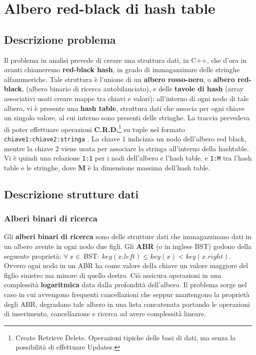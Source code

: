 \def\baselinestretch{1}
\chapter{Albero red-black di hash table}
\def\baselinestretch{1.66}
\thispagestyle{headings}

\def\baselinestretch{1}
\section{Descrizione problema}
\def\baselinestretch{1.66}
\thispagestyle{headings}

Il problema in analisi prevede di creare una struttura dati, in C++, che d'ora in avanti chiameremo
\textbf{red-black hash}, in grado di immagazzinare delle stringhe alfanumeriche. Tale struttura
\`e l'unione di un \textbf{albero rosso-nero}, o \textbf{albero
red-black}, (albero binario di ricerca autobilanciato), e delle \textbf{tavole di hash} (array associativi usati creare mappe tra chiavi e valori): all'interno di ogni nodo di tale albero,
vi \`e presente una \textbf{hash table}, struttura dati che associa per ogni chiave un singolo valore, al cui
interno sono presenti delle stringhe. La traccia prevedeva di poter effettuare operazioni
\textbf{C.R.D.}\footnote{Create Retrieve Delete. Operazioni tipiche delle basi di dati, ma senza la
possibilit\`a di effettuare Updates.} su tuple nel formato \verb|chiave1:chiave2:stringa| . 
La chiave 1 indicizza un nodo dell'albero red black, mentre la chiave 2 viene usata per associare la stringa all'interno
della hashtable.
Vi \`e quindi una relazione \verb|1:1| per i nodi dell'albero e l'hash table, e \verb|1:M| tra l'hash table
e le stringhe, dove \textbf{M} \`e la dimensione massima dell'hash table.

\def\baselinestretch{1}
\section{Descrizione strutture dati}
\def\baselinestretch{1.66}
\thispagestyle{headings}
\subsection{Alberi binari di ricerca}
\indent Gli \textbf{alberi binari di ricerca} sono delle strutture dati
 che immagazzinano dati in un albero avente in ogni nodo due 
 figli. Gli \textbf{ABR} (o in inglese BST) godono della seguente propriet\`a:
 $\forall \ x \in \ $BST$ :\ key(x.left) \leq key(x) < key(x.right)$. 
 Ovvero ogni nodo in un ABR ha come valore della chiave un valore
 maggiore del figlio sinistro ma minore di quello destro.
 \newline Ci\`o assicura operazioni in una complessit\`a 
 \textbf{logaritmica} data dalla profondit\`a dell'albero.
 Il problema sorge nel caso in cui avvengono frequenti cancellazioni che seppur mantengono
 la propriet\`a degli ABR, degradano tale albero in una lista concatenata
 portando le operazioni di inserimento, cancellazione
 e ricerca ad avere complessit\`a lineare.

